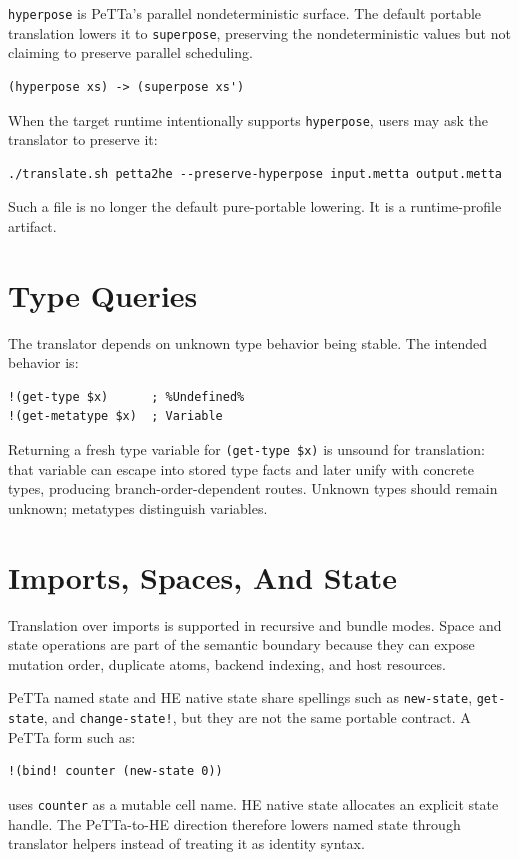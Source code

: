 \documentclass[11pt]{article}
\newcommand{\code}[1]{\texttt{#1}}
\newcommand{\HE}{\textup{HE}}
\newcommand{\PeTTa}{\textup{PeTTa}}
\begin{document}
\code{hyperpose} is \PeTTa{}'s parallel nondeterministic surface.  The default
portable translation lowers it to \code{superpose}, preserving the
nondeterministic values but not claiming to preserve parallel scheduling.

\begin{lstlisting}
(hyperpose xs) -> (superpose xs')
\end{lstlisting}

When the target runtime intentionally supports \code{hyperpose}, users may ask
the translator to preserve it:

\begin{lstlisting}
./translate.sh petta2he --preserve-hyperpose input.metta output.metta
\end{lstlisting}

Such a file is no longer the default pure-portable lowering.  It is a
runtime-profile artifact.

\section{Type Queries}

The translator depends on unknown type behavior being stable.  The intended
behavior is:

\begin{lstlisting}
!(get-type $x)      ; %Undefined%
!(get-metatype $x)  ; Variable
\end{lstlisting}

Returning a fresh type variable for \code{(get-type \$x)} is unsound for
translation: that variable can escape into stored type facts and later unify
with concrete types, producing branch-order-dependent routes.  Unknown types
should remain unknown; metatypes distinguish variables.

\section{Imports, Spaces, And State}

Translation over imports is supported in recursive and bundle modes.  Space and
state operations are part of the semantic boundary because they can expose
mutation order, duplicate atoms, backend indexing, and host resources.

\PeTTa{} named state and \HE{} native state share spellings such as
\code{new-state}, \code{get-state}, and \code{change-state!}, but they are not
the same portable contract.  A \PeTTa{} form such as:
\begin{lstlisting}
!(bind! counter (new-state 0))
\end{lstlisting}
uses \code{counter} as a mutable cell name.  \HE{} native state allocates an
explicit state handle.  The \PeTTa{}-to-\HE{} direction therefore lowers named
state through translator helpers instead of treating it as identity syntax.
\end{document}
